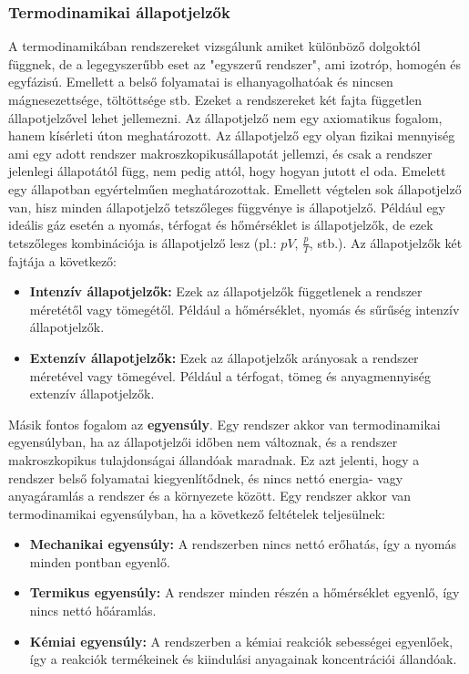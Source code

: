 \documentclass[../main.tex]{subfiles}
\begin{document}
\subsubsection{Termodinamikai állapotjelzők}
A termodinamikában rendszereket vizsgálunk amiket különböző dolgoktól függnek, de a legegyszerűbb eset az "egyszerű rendszer", ami izotróp, homogén és egyfázisú. Emellett a belső folyamatai is elhanyagolhatóak és nincsen mágnesezettsége, töltöttsége stb.
Ezeket a rendszereket két fajta független állapotjelzővel lehet jellemezni. Az állapotjelző nem egy axiomatikus fogalom, hanem kísérleti úton meghatározott.
Az állapotjelző egy olyan fizikai mennyiség ami egy adott rendszer makroszkopikusállapotát jellemzi, és csak a rendszer jelenlegi állapotától függ, nem pedig attól, hogy hogyan jutott el oda. 
Emelett egy állapotban egyértelműen meghatározottak. Emellett végtelen sok állapotjelző van, hisz minden állapotjelző tetszőleges függvénye is állapotjelző. Például egy ideális gáz esetén a nyomás, térfogat és hőmérséklet is állapotjelzők,
de ezek tetszőleges kombinációja is állapotjelző lesz (pl.: $pV$, $\frac{p}{T}$, stb.). Az állapotjelzők két fajtája a következő:
\begin{itemize}
    \item \textbf{Intenzív állapotjelzők:} Ezek az állapotjelzők függetlenek a rendszer méretétől vagy tömegétől. Például a hőmérséklet, nyomás és sűrűség intenzív állapotjelzők.
    \item \textbf{Extenzív állapotjelzők:} Ezek az állapotjelzők arányosak a rendszer méretével vagy tömegével. Például a térfogat, tömeg és anyagmennyiség extenzív állapotjelzők.
\end{itemize}
Másik fontos fogalom az \textbf{egyensúly}. Egy rendszer akkor van termodinamikai egyensúlyban, ha az állapotjelzői időben nem változnak, és a rendszer makroszkopikus tulajdonságai állandóak maradnak. Ez azt jelenti, hogy a rendszer belső folyamatai kiegyenlítődnek, és nincs nettó energia- vagy anyagáramlás a rendszer és a környezete között.
Egy rendszer akkor van termodinamikai egyensúlyban, ha a következő feltételek teljesülnek:
\begin{itemize}
    \item \textbf{Mechanikai egyensúly:} A rendszerben nincs nettó erőhatás, így a nyomás minden pontban egyenlő.
    \item \textbf{Termikus egyensúly:} A rendszer minden részén a hőmérséklet egyenlő, így nincs nettó hőáramlás.
    \item \textbf{Kémiai egyensúly:} A rendszerben a kémiai reakciók sebességei egyenlőek, így a reakciók termékeinek és kiindulási anyagainak koncentrációi állandóak.
\end{itemize}
\end{document}
